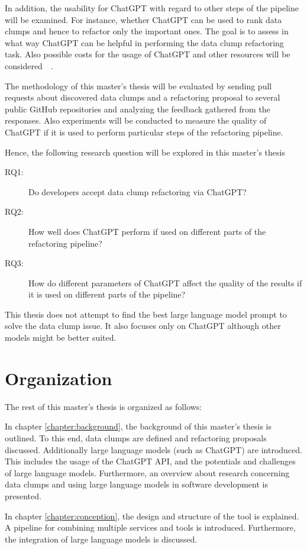 In addition, the usability for ChatGPT with regard to other steps of the pipeline will be examined. For instance, whether ChatGPT can be used to rank data clumps and hence to refactor only the important ones. The goal is to assess in what way ChatGPT can be helpful in performing the data clump refactoring task. Also possible costs for the usage of ChatGPT and other resources will be considered~\cite{xia2023conversation}~\cite{a_bot_for_fixing_static}.


The methodology of this master's thesis will be evaluated by sending  pull requests about discovered data clumps and a refactoring proposal to several public GitHub repositories and analyzing the feedback gathered from the responses. Also experiments will be conducted to measure the quality of ChatGPT if it is used to perform particular steps of the refactoring pipeline.  

Hence, the following research question will be explored in this master's thesis

\begin{description}
    \item [RQ1:] Do developers accept data clump refactoring via ChatGPT?
    \item [RQ2:] How well does ChatGPT perform if used on different parts of the refactoring pipeline?
    \item [RQ3:] How do different parameters of ChatGPT affect the quality of the results if it is used on different parts of the pipeline?
\end{description}
This thesis does not attempt to find the best large language model prompt to solve the data clump issue. It also focuses only on ChatGPT although other models might be better suited. 
\section{Organization}
The rest of this master's thesis is organized as follows:

In chapter \ref{chapter:background}, the background of this master's thesis  is outlined. To this end, data clumps are defined and refactoring proposals discussed. Additionally large language models (such as ChatGPT) are introduced. This includes the usage of the ChatGPT \ac{API}, and the potentials and challenges of large language models.  Furthermore, an overview about research  concerning data clumps and using large language models in software development is presented. 

In chapter \ref{chapter:conception}, the design and structure of the tool is explained. A pipeline for combining multiple services and tools is introduced. Furthermore, the integration of large language models is discussed. 

